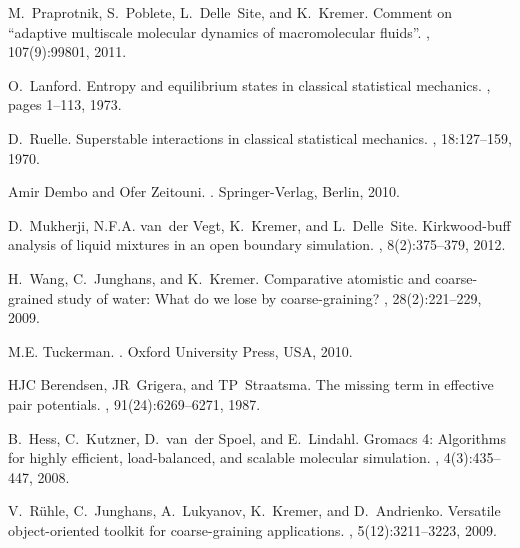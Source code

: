 \documentclass[aps,a4paper,reprint,onecolumn]{revtex4}
\begin{document}
\begin{thebibliography}{10}
M.~Praprotnik, S.~Poblete, L.~Delle~Site, and K.~Kremer.
\newblock Comment on “adaptive multiscale molecular dynamics of
  macromolecular fluids”.
, 107(9):99801, 2011.

O.~Lanford.
\newblock Entropy and equilibrium states in classical statistical mechanics.
, pages 1--113,
  1973.

D.~Ruelle.
\newblock Superstable interactions in classical statistical mechanics.
, 18:127--159, 1970.

Amir Dembo and Ofer Zeitouni.
.
\newblock Springer-Verlag, Berlin, 2010.

D.~Mukherji, N.F.A. van~der Vegt, K.~Kremer, and L.~Delle~Site.
\newblock Kirkwood-buff analysis of liquid mixtures in an open boundary
  simulation.
, 8(2):375--379,
  2012.

H.~Wang, C.~Junghans, and K.~Kremer.
\newblock Comparative atomistic and coarse-grained study of water: What do we
  lose by coarse-graining?
, 28(2):221--229, 2009.

M.E. Tuckerman.
.
\newblock Oxford University Press, USA, 2010.

HJC Berendsen, JR~Grigera, and TP~Straatsma.
\newblock The missing term in effective pair potentials.
, 91(24):6269--6271, 1987.

B.~Hess, C.~Kutzner, D.~van~der Spoel, and E.~Lindahl.
\newblock Gromacs 4: Algorithms for highly efficient, load-balanced, and
  scalable molecular simulation.
, 4(3):435--447,
  2008.

V.~R\"uhle, C.~Junghans, A.~Lukyanov, K.~Kremer, and D.~Andrienko.
\newblock Versatile object-oriented toolkit for coarse-graining applications.
, 5(12):3211--3223,
  2009.

\end{thebibliography}
% 
\end{document}
